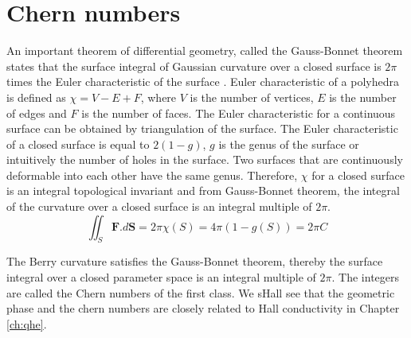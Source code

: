 \section{Chern numbers}
An important theorem of differential geometry, called the Gauss-Bonnet theorem states that the surface integral of Gaussian curvature over a closed surface is $2\pi$ times the
Euler characteristic of the surface \cite{rasta2016geometry,moore2014introduction}. Euler characteristic of a polyhedra is defined as $\chi = V - E + F$, where $V$ is the number of vertices, $E$ is the number of edges and $F$ is the
number of faces. The Euler characteristic for a continuous surface can be obtained by triangulation of the surface. The Euler characteristic of a closed surface is equal to 
$2(1-g)$, $g$ is the genus of the surface or intuitively the number of holes in the surface. Two surfaces that are continuously deformable into each other have the same genus.
Therefore, $\chi$ for a closed surface is an integral topological invariant and from Gauss-Bonnet theorem, the integral of the curvature over a closed surface is an integral multiple of
$2\pi$.
\begin{equation}
\iint_{S}{\mathbf{F}.d\mathbf{S}} = 2\pi\chi(S) = 4\pi(1-g(S)) = 2\pi C
\end{equation}

The Berry curvature satisfies the Gauss-Bonnet theorem, thereby the surface integral over a closed parameter space is an integral multiple of $2\pi$. The integers are called the
Chern numbers of the first class\cite{simon1983holonomy}. We sHall see that the geometric phase and the chern numbers are closely related to Hall conductivity in Chapter \ref{ch:qhe}.